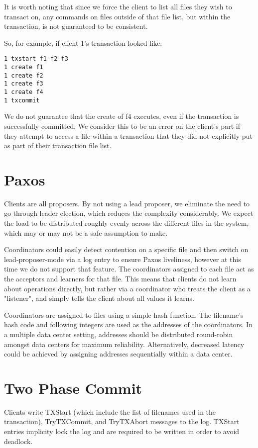 \documentclass[11pt]{article}
\begin{document}
It is worth noting that since we force the client to list all files they wish to transact on, any commands on files outside of that file list, but within the transaction, is not guaranteed to be consistent.

So, for example, if client 1's transaction looked like:
\begin{verbatim}
1 txstart f1 f2 f3
1 create f1
1 create f2
1 create f3
1 create f4
1 txcommit
\end{verbatim}
We do not guarantee that the create of f4 executes, even if the transaction is successfully committed. We consider this to be an error on the client's part if they attempt to access a file within a transaction that they did not explicitly put as part of their transaction file list. 

\section{Paxos}

Clients are all proposers. By not using a lead proposer, we eliminate the need to go through leader election, which reduces the complexity considerably. We expect the load to be distributed roughly evenly across the different files in the system, which may or may not be a safe assumption to make.

Coordinators could easily detect contention on a specific file and then switch on lead-proposer-mode via a log entry to ensure Paxos liveliness, however at this time we do not support that feature.
The coordinators assigned to each file act as the acceptors and learners for that file. This means that clients do not learn about operations directly, but rather via a coordinator who treats the client as a "listener", and simply tells the client about all values it learns.

Coordinators are assigned to files using a simple hash function.
The filename's hash code and following integers are used as the addresses of the coordinators.
In a multiple data center setting, addresses should be distributed round-robin amongst data centers for maximum reliability.
Alternatively, decreased latency could be achieved by assigning addresses sequentially within a data center.

\section{Two Phase Commit}

Clients write TXStart (which include the list of filenames used in the transaction), TryTXCommit, and TryTXAbort messages to the log.
TXStart entries implicity lock the log and are required to be written in order to avoid deadlock.
\end{document}

